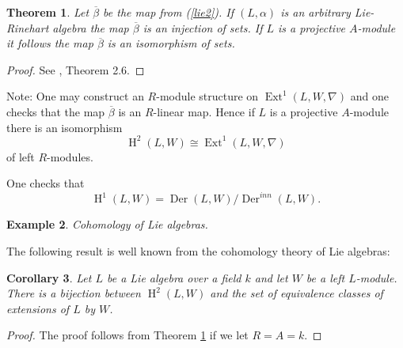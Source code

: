 \documentclass{amsart}
\theoremstyle{plain}
\newtheorem{theorem}{Theorem}[section]
\newtheorem{corollary}[theorem]{Corollary}
\newtheorem{example}[theorem]{Example}
\theoremstyle{definition}
\theoremstyle{remark}
\numberwithin{equation}{theorem}
\begin{document}
\begin{theorem} \label{h2} Let $\overline{\beta}$ be the map from (\ref{lie2}).
If $(L,\alpha)$ is an arbitrary Lie-Rinehart algebra the map $\overline{\beta}$ 
is an injection of sets. If $L$ is a projective ${A}$-module it follows the map $\overline{\beta}$ is an 
isomorphism of sets.
\end{theorem}
\begin{proof} See  \cite{huebschmann}, Theorem 2.6.
\end{proof}

Note: One may construct an ${R}$-module structure on ${\operatorname{Ext} }^1(L,W,\nabla)$ and one checks that the map $\overline{\beta}$ 
is an ${R}$-linear map. Hence if $L$ is a projective ${A}$-module there is an isomorphism
\[ {\operatorname{H} }^2(L,W)\cong {\operatorname{Ext} }^1(L,W,\nabla) \]
of left ${R}$-modules.

One checks that
\[ {\operatorname{H} }^1(L,W)={\operatorname{Der} }(L,W)/{\operatorname{Der} }^{inn}(L,W).\]

\begin{example} Cohomology of Lie algebras.\end{example}

The following result is well known from the cohomology theory of Lie algebras:

\begin{corollary} Let $L$ be a Lie algebra over  a field $k$ and let $W$ be a left $L$-module.
There is a bijection between ${\operatorname{H} }^2(L,W)$ and the set of equivalence classes of extensions of $L$
by $W$.
\end{corollary}
\begin{proof} The proof follows from Theorem \ref{h2} if we let ${R}={A}=k$.
\end{proof}
\end{document}
